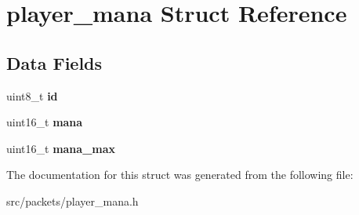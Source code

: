 \hypertarget{structplayer__mana}{}\section{player\+\_\+mana Struct Reference}
\label{structplayer__mana}
\subsection*{Data Fields}
\begin{DoxyCompactItemize}
\item 
\hypertarget{structplayer__mana_a85bb6674e559264f4727eeef86540f39}{}uint8\+\_\+t {\bfseries id}\label{structplayer__mana_a85bb6674e559264f4727eeef86540f39}

\item 
\hypertarget{structplayer__mana_a7362c2de38ed79e51cf47fdddf271847}{}uint16\+\_\+t {\bfseries mana}\label{structplayer__mana_a7362c2de38ed79e51cf47fdddf271847}

\item 
\hypertarget{structplayer__mana_a6f00d3ad0f8063890fd6a565d9fd1517}{}uint16\+\_\+t {\bfseries mana\+\_\+max}\label{structplayer__mana_a6f00d3ad0f8063890fd6a565d9fd1517}

\end{DoxyCompactItemize}


The documentation for this struct was generated from the following file\+:\begin{DoxyCompactItemize}
\item 
src/packets/player\+\_\+mana.\+h\end{DoxyCompactItemize}
